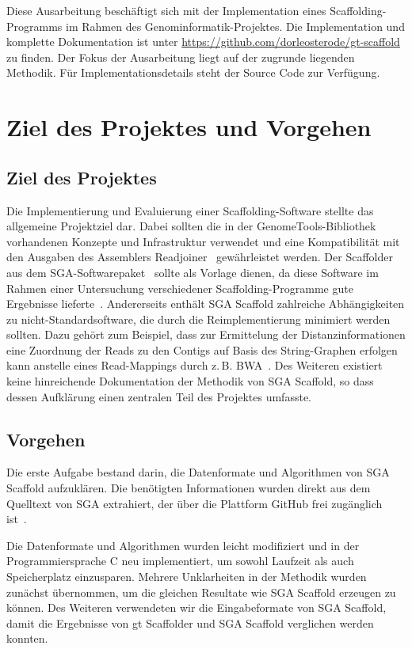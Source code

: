\documentclass[a4paper,11pt,parskip]{scrartcl}
\begin{document}
Diese Ausarbeitung beschäftigt sich mit der Implementation eines
Scaffolding-Programms im Rahmen des Genominformatik-Projektes. Die
Implementation und komplette Dokumentation ist unter
\url{https://github.com/dorleosterode/gt-scaffold} zu finden. Der Fokus der
Ausarbeitung liegt auf der zugrunde liegenden Methodik. Für
Implementationsdetails steht der Source Code zur Verfügung.

\section{Ziel des Projektes und Vorgehen}
\subsection{Ziel des Projektes}
Die Implementierung und Evaluierung einer Scaffolding-Software stellte
das allgemeine Projektziel dar. Dabei sollten die in der
GenomeTools-Bibliothek~\cite{Gremme:2013} vorhandenen Konzepte und
Infrastruktur verwendet und eine Kompatibilität mit den Ausgaben des
Assemblers Readjoiner~\cite{Gonnella:2012gn} gewährleistet werden. Der
Scaffolder aus dem SGA-Softwarepaket~\cite{Simpson:2012ef} sollte als
Vorlage dienen, da diese Software im Rahmen einer Untersuchung
verschiedener Scaffolding-Programme gute Ergebnisse
lieferte~\cite{Hunt:2014dh}. Andererseits enthält SGA Scaffold
zahlreiche Abhängigkeiten zu nicht-Standardsoftware, die durch die
Reimplementierung minimiert werden sollten. Dazu gehört zum Beispiel,
dass zur Ermittelung der Distanzinformationen eine Zuordnung der Reads
zu den Contigs auf Basis des String-Graphen erfolgen kann anstelle eines
Read-Mappings durch z.\,B. BWA~\cite{Li:2009}. Des Weiteren existiert keine
hinreichende Dokumentation der Methodik von SGA Scaffold, so dass
dessen Aufklärung einen zentralen Teil des Projektes umfasste.

\subsection{Vorgehen}
Die erste Aufgabe bestand darin, die Datenformate und Algorithmen
von SGA Scaffold aufzuklären. Die benötigten Informationen
wurden direkt aus dem Quelltext von SGA extrahiert, der über die
Plattform GitHub frei zugänglich ist~\cite{source}.

Die Datenformate und Algorithmen wurden leicht modifiziert und in
der Programmiersprache C neu implementiert, um sowohl Laufzeit
als auch Speicherplatz einzusparen. Mehrere Unklarheiten in der
Methodik wurden zunächst übernommen, um die gleichen Resultate wie
SGA Scaffold erzeugen zu können. Des Weiteren verwendeten wir die
Eingabeformate von SGA Scaffold, damit die Ergebnisse von gt Scaffolder
und SGA Scaffold verglichen werden konnten.
\end{document}
